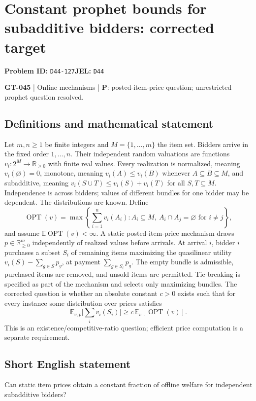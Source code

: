 \documentclass[11pt,a4paper]{article}
\begin{document}
\section*{Constant prophet bounds for subadditive bidders: corrected target}
\textbf{Problem ID:} \texttt{D44-127}\quad \textbf{JEL:} \texttt{D44}\par
\label{problem:OP-0175}
\label{game:GT-045}
{\sffamily\small\color{muted}
\textbf{GT-045} | Online mechanisms | \textbf{P}: posted-item-price question; unrestricted prophet question resolved.
\par}
\subsection*{Definitions and mathematical statement}
Let $m,n\geq1$ be finite integers and $M=\{1,\ldots,m\}$ the item set. Bidders arrive in the fixed order $1,\ldots,n$. Their independent random valuations are functions $v_i:2^M\to\mathbb R_{\geq0}$ with finite real values. Every realization is normalized, meaning $v_i(\varnothing)=0$, monotone, meaning $v_i(A)\leq v_i(B)$ whenever $A\subseteq B\subseteq M$, and subadditive, meaning $v_i(S\cup T)\leq v_i(S)+v_i(T)$ for all $S,T\subseteq M$. Independence is across bidders; values of different bundles for one bidder may be dependent. The distributions are known. Define
\[
 \operatorname{OPT}(v)=\max\left\{\sum_{i=1}^n v_i(A_i): A_i\subseteq M,\ A_i\cap A_j=\varnothing\text{ for }i\ne j\right\},
\]
and assume $\mathbb E\operatorname{OPT}(v)<\infty$. A static posted-item-price mechanism draws $p\in\mathbb R_{\geq0}^m$ independently of realized values before arrivals. At arrival $i$, bidder $i$ purchases a subset $S_i$ of remaining items maximizing the quasilinear utility $v_i(S)-\sum_{g\in S}p_g$, at payment $\sum_{g\in S_i}p_g$. The empty bundle is admissible, purchased items are removed, and unsold items are permitted. Tie-breaking is specified as part of the mechanism and selects only maximizing bundles. The corrected question is whether an absolute constant $c>0$ exists such that for every instance some distribution over prices satisfies
\[
 \mathbb E_{v,p}\Big[\sum_i v_i(S_i)\Big]\geq c\,\mathbb E_v[\operatorname{OPT}(v)].
\]
This is an existence/competitive-ratio question; efficient price computation is a separate requirement.
\subsection*{Short English statement}
Can static item prices obtain a constant fraction of offline welfare for independent subadditive bidders?
\end{document}
